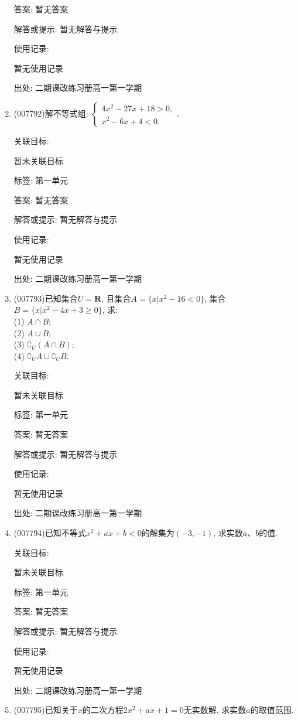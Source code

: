 \documentclass[10pt,a4paper]{article}
\begin{document}
\begin{enumerate}[1.]
答案: 暂无答案

解答或提示: 暂无解答与提示

使用记录:

暂无使用记录


出处: 二期课改练习册高一第一学期
\item { (007792)}解不等式组: $\begin{cases} 4x^2-27x+18>0, \\ x^2-6x+4<0. \end{cases}$.


关联目标:

暂未关联目标



标签: 第一单元

答案: 暂无答案

解答或提示: 暂无解答与提示

使用记录:

暂无使用记录


出处: 二期课改练习册高一第一学期
\item { (007793)}已知集合$U=\mathbf{R}$, 且集合$A=\{x|x^2-16<0\}$, 集合$B=\{x|x^2-4x+3\ge 0\}$, 求:\\
(1) $A\cap B$;\\
(2) $A\cup B$;\\
(3) $\complement _U(A\cap B)$;\\
(4) $\complement _UA\cup \complement _UB$.


关联目标:

暂未关联目标



标签: 第一单元

答案: 暂无答案

解答或提示: 暂无解答与提示

使用记录:

暂无使用记录


出处: 二期课改练习册高一第一学期
\item { (007794)}已知不等式$x^2+ax+b<0$的解集为$(-3,-1)$, 求实数$a$、$b$的值.


关联目标:

暂未关联目标



标签: 第一单元

答案: 暂无答案

解答或提示: 暂无解答与提示

使用记录:

暂无使用记录


出处: 二期课改练习册高一第一学期
\item { (007795)}已知关于$x$的二次方程$2x^2+ax+1=0$无实数解, 求实数$a$的取值范围.



\end{enumerate}
\end{document}
